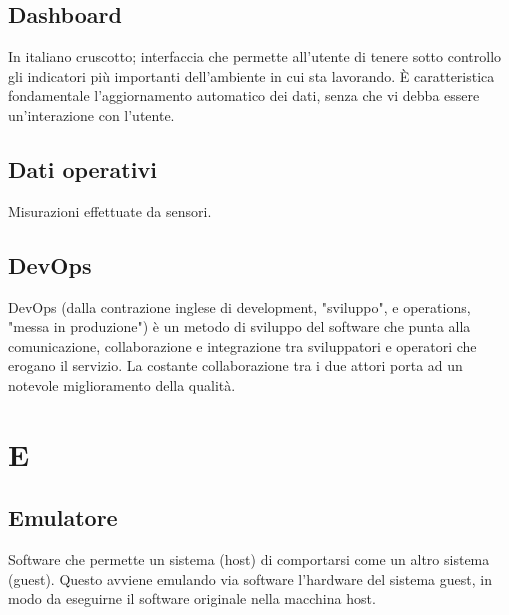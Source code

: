 \subsection*{Dashboard}
In italiano cruscotto; interfaccia che permette all'utente di tenere sotto controllo gli indicatori più importanti dell'ambiente in cui sta lavorando. È caratteristica fondamentale l'aggiornamento automatico dei dati, senza che vi debba essere un'interazione con l'utente.

\subsection*{Dati operativi}
Misurazioni effettuate da sensori.


\subsection*{DevOps}
DevOps (dalla contrazione inglese di development, "sviluppo", e operations, "messa in produzione") è un metodo di sviluppo del software che punta alla comunicazione, collaborazione e integrazione tra sviluppatori e operatori che erogano il servizio. La costante collaborazione tra i due attori porta ad un notevole miglioramento della qualità.

\clearpage
\section*{E}

\subsection*{Emulatore}
Software che permette un sistema (host) di comportarsi come un altro sistema (guest).
Questo avviene emulando via software l'hardware del sistema guest, in modo da eseguirne il software originale nella macchina host.


